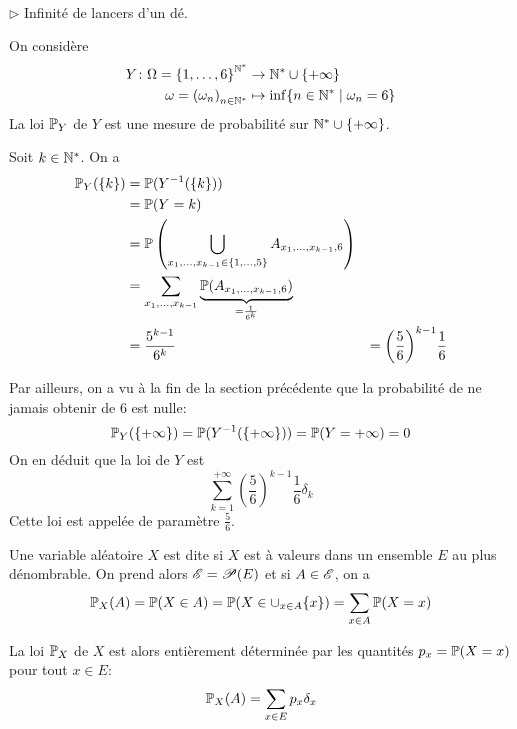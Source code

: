 \begin{exs}\,\\
    \(\triangleright\) Infinité de lancers d'un dé.

    On considère
    \begin{equation*}
        \begin{aligned}
            Y\colon \Omega={\{1,\dots,6\}}^{\mathbb{N}^\ast}&\to \mathbb{N}^\ast\cup\{+\infty\}\\
            \omega={{(\omega_n)}_{n\in\mathbb{N}^\ast}}&\mapsto \inf\{n\in\mathbb{N}^\ast\mid \omega_n = 6\}
        \end{aligned}
    \end{equation*}
    La loi \(\mathbb{P}_Y\) de \(Y\) est une mesure de probabilité sur \(\mathbb{N}^\ast\cup\{+\infty\}\).

    Soit \(k\in\mathbb{N}^\ast\). On a
    \begin{equation*}
        \begin{aligned}
            \mathbb{P}_Y(\{k\}) 
            &= \mathbb{P}(Y^{-1}(\{k\}))\\
            &= \mathbb{P}(Y=k)\\
            &= \mathbb{P}\left(\bigcup_{x_1,\dots,x_{k-1}\in\{1,\dots,5\}}A_{x_1,\dots,x_{k-1},6}\right)\\
            &= \sum_{x_1,\dots,x_{k-1}} \underbrace{\mathbb{P}(A_{x_1,\dots,x_{k-1},6})}_{=\frac{1}{6^k}}\\
            &= \frac{5^{k-1}}{6^k}
            &= {\left(\frac{5}{6}\right)}^{k-1}\frac{1}{6}
        \end{aligned}
    \end{equation*}

    Par ailleurs, on a vu à la fin de la section précédente que
    la probabilité de ne jamais obtenir de 6 est nulle:
    \begin{equation*}
        \mathbb{P}_Y(\{+\infty\}) = \mathbb{P}(Y^{-1}(\{+\infty\})) = \mathbb{P}(Y=+\infty) = 0
    \end{equation*}
    On en déduit que la loi de \(Y\) est 
    \begin{equation*}
        \sum_{k=1}^{+\infty} {\left(\frac{5}{6}\right)}^{k-1}\frac{1}{6}\delta_k
    \end{equation*}
    Cette loi est appelée  de paramètre \(\frac{5}{6}\).
\end{exs}

\begin{definition}
    Une variable aléatoire \(X\) est dite  si \(X\) est à valeurs dans un ensemble \(E\) au plus dénombrable.
    On prend alors \(\mathscr{E} = \mathscr{P}(E)\) et si \(A\in\mathscr{E}\), on a
    \begin{equation*}
        \mathbb{P}_X(A) = \mathbb{P}(X\in A) = \mathbb{P}(X\in\cup_{x\in A}\{x\}) = \sum_{x\in A}\mathbb{P}(X=x)
    \end{equation*}

    La loi \(\mathbb{P}_X\) de \(X\) est alors entièrement déterminée par les quantités \(p_x = \mathbb{P}(X=x)\) pour tout \(x\in E\):
    \begin{equation*}
        \mathbb{P}_X(A) = \sum_{x\in E}p_x\delta_x
    \end{equation*}
\end{definition}

